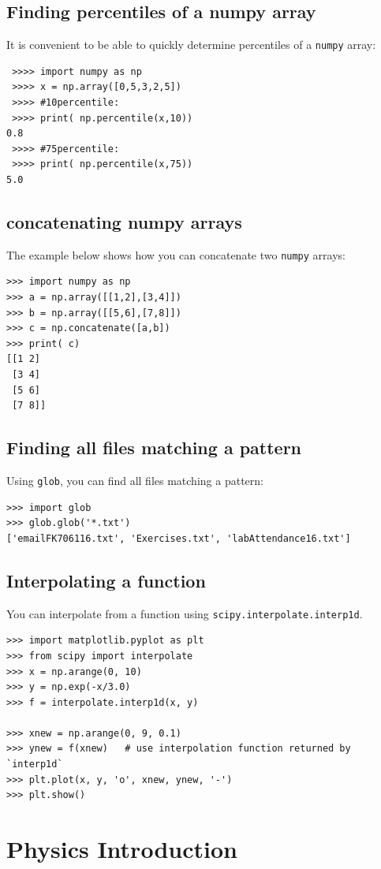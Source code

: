 \documentclass[11pt,a4paper]{exam}
\begin{document}
\subsection{Finding percentiles of a numpy array}
It is convenient to be able to quickly determine percentiles of a \texttt{numpy} array: 
\begin{lstlisting}
 >>>> import numpy as np
 >>>> x = np.array([0,5,3,2,5])
 >>>> #10percentile:
 >>>> print( np.percentile(x,10))
0.8
 >>>> #75percentile:
 >>>> print( np.percentile(x,75))
5.0
\end{lstlisting}
\subsection{concatenating numpy arrays}
The example below shows how you can concatenate two \texttt{numpy} arrays: 
\begin{lstlisting}
>>> import numpy as np
>>> a = np.array([[1,2],[3,4]])
>>> b = np.array([[5,6],[7,8]])
>>> c = np.concatenate([a,b])
>>> print( c)
[[1 2]
 [3 4]
 [5 6]
 [7 8]]
\end{lstlisting}

\subsection{Finding all files matching a pattern}
Using \texttt{glob}, you can find all files matching a pattern: 
\begin{lstlisting}
>>> import glob
>>> glob.glob('*.txt')
['emailFK706116.txt', 'Exercises.txt', 'labAttendance16.txt']
\end{lstlisting}

\subsection{Interpolating a function}
You can interpolate from a function using \texttt{scipy.interpolate.interp1d}.

\begin{lstlisting}
>>> import matplotlib.pyplot as plt
>>> from scipy import interpolate
>>> x = np.arange(0, 10)
>>> y = np.exp(-x/3.0)
>>> f = interpolate.interp1d(x, y)

>>> xnew = np.arange(0, 9, 0.1)
>>> ynew = f(xnew)   # use interpolation function returned by `interp1d`
>>> plt.plot(x, y, 'o', xnew, ynew, '-')
>>> plt.show()
\end{lstlisting}

\section{Physics Introduction}
\end{document}

